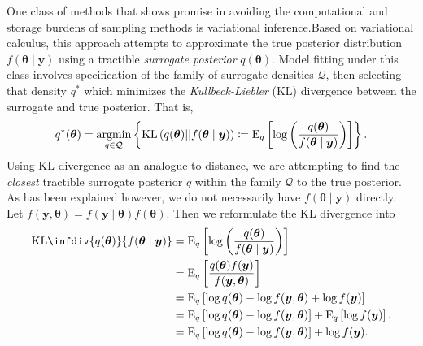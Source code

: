 One class of methods that shows promise in avoiding the computational and storage
    burdens of sampling methods is variational inference.\needcite  Based on variational
    calculus, this approach attempts to approximate the true posterior distribution
    $f(\bm{\theta}\mid\bm{y})$ using a tractible \emph{surrogate posterior} 
    $q(\bm{\theta})$.  Model fitting under this class involves specification of the
    family of surrogate densities $\mathcal{Q}$, then selecting that density 
    $q^*$ which minimizes the \emph{Kullbeck-Liebler} (KL) divergence between 
    the surrogate and true posterior.  That is,
    \[
        q^*(\bm{\theta}) = \operatorname*{argmin}_{q\in\mathcal{Q}}\left\lbrace
        \text{KL}\left(q(\bm{\theta})||f(\bm{\theta}\mid\bm{y})\right) 
        \coloneqq
        \text{E}_{q}\left[\log\left(
        \frac{q(\bm{\theta})}{f(\bm{\theta}\mid\bm{y})}
        \right)\right]
        \right\rbrace.
    \]
    Using KL divergence as an analogue to distance, we are attempting to find
    the \emph{closest} tractible surrogate posterior $q$ within the family $\mathcal{Q}$ 
    to the true posterior.
    As has been explained however, we do not necessarily have $f(\bm{\theta}\mid\bm{y})$
    directly.  Let $f(\bm{y},\bm{\theta}) = f(\bm{y}\mid\bm{\theta})f(\bm{\theta})$.
    Then we reformulate the KL divergence into
    \[
        \begin{aligned}
        \text{KL}\infdiv{q(\bm{\theta})}{f(\bm{\theta}\mid\bm{y})}
            &=\text{E}_{q}\left[\log\left(
                \frac{q(\bm{\theta})}{f(\bm{\theta}\mid\bm{y})}
                \right)\right]\\
            &= \text{E}_{q}\left[
                \frac{q(\bm{\theta})f(\bm{y})}{f(\bm{y},\bm{\theta})}
                \right]\\
            &= \text{E}_{q}\left[
                \log q(\bm{\theta}) - \log f(\bm{y},\bm{\theta}) 
                + \log f(\bm{y})
                \right]\\
            &= \text{E}_{q}\left[
                \log q(\bm{\theta}) - \log f(\bm{y},\bm{\theta})\right] + 
                    \text{E}_{q}\left[\log f(\bm{y})\right].\\
            &= \text{E}_{q}\left[
                \log q(\bm{\theta}) - \log f(\bm{y},\bm{\theta})\right] + 
                   \log f(\bm{y}).
        \end{aligned}
    \]
